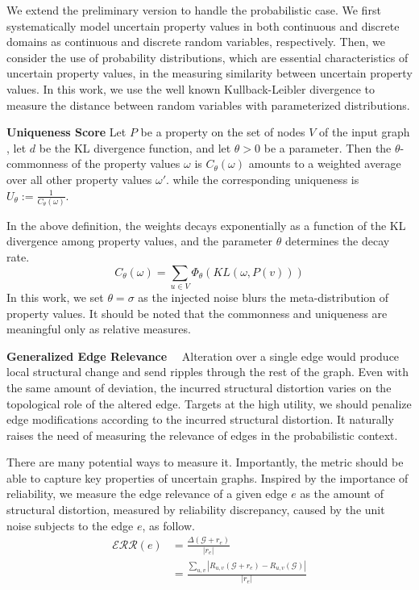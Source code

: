 We extend the preliminary version to handle the probabilistic case. 
We first systematically model uncertain property values in both continuous and discrete domains as continuous and discrete random variables, respectively.
Then, we consider the use of probability distributions, which are essential characteristics of uncertain property values, in the measuring similarity between uncertain property values. 
In this work, we use the well known Kullback-Leibler divergence to measure the distance between random variables with parameterized distributions. 

\begin{definition}
    \textbf{Uniqueness Score}
    Let $P$ be a property on the set of nodes $V$ of the input graph ,  
    let $d$ be the KL divergence function, 
    and let $\theta >0$  be a parameter. 
    Then the $\theta$-commonness of the property values $\omega$
    is $C_{\theta}(\omega)$ amounts to a weighted average over all other property values $\omega'$.    
     while the corresponding uniqueness is $U_{\theta}:= \frac{1}{C_{\theta}(\omega)}$. 
    \vspace{-5pt}
\end{definition} 
In the above definition, the weights decays exponentially as a function of the KL divergence among property values, 
and the parameter $\theta$ determines the decay rate. 
\begin{equation*}
  C_{\theta}(\omega) = \sum_{u \in V} \Phi_{\theta}(KL(\omega, P(v)))
\end{equation*}
In this work, we set $\theta=\sigma$ as the injected noise blurs the meta-distribution of property values. 
It should be noted that the commonness and uniqueness are meaningful only as relative measures. 
 
\textbf{Generalized Edge Relevance}~~
Alteration over a single edge would produce local structural change and send ripples through the rest of the graph. 
Even with the same amount of deviation, the incurred structural distortion varies on the topological role of the altered edge. 
Targets at the high utility, we should penalize edge modifications according to the incurred structural distortion.  
It naturally raises the need of measuring the relevance of edges in the probabilistic context. 

There are many potential ways to measure it. 
Importantly, the metric should be able to capture key properties of uncertain graphs.
Inspired by the importance of reliability, we measure the edge relevance of a given edge $e$ as the amount of structural distortion, measured by reliability discrepancy, caused by the unit noise subjects to the edge $e$, as follow. 
\begin{equation*}
  \begin{split}
    \mathcal{ERR}({e}) &= \frac{\Delta(\mathcal{G}+r_{e})}{|r_{e}|}  \\
                       &= \frac{\sum_{u,v} |R_{u,v}(\mathcal{G}+r_{e}) -R_{u,v}(\mathcal{G})|} {|r_{e}|}
  \end{split}
\end{equation*}

